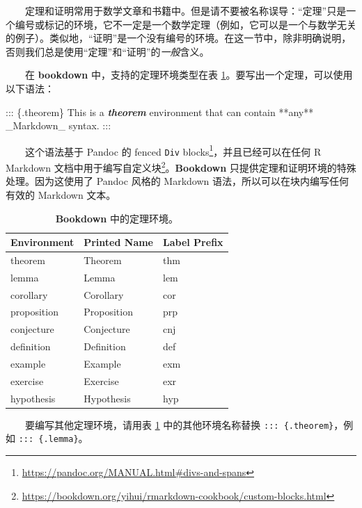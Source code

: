 \documentclass[
  12pt,
]{krantz}
\newenvironment{Shaded}{\begin{snugshade}}{\end{snugshade}}
\newcommand{\InformationTok}[1]{\textcolor[rgb]{0.56,0.35,0.01}{\textbf{\textit{#1}}}}
\newcommand{\NormalTok}[1]{#1}
\renewcommand{\href}[2]{#2\footnote{\url{#1}}}
\theoremstyle{definition}
\theoremstyle{definition}
\theoremstyle{definition}
\theoremstyle{definition}
\theoremstyle{remark}
\begin{document}
  定理和证明常用于数学文章和书籍中。但是请不要被名称误导：``定理''只是一个编号或标记的环境，它不一定是一个数学定理（例如，它可以是一个与数学无关的例子）。类似地，``证明''是一个没有编号的环境。在这一节中，除非明确说明，否则我们总是使用``定理''和``证明''的\emph{一般}含义。

  在 \textbf{bookdown} 中，支持的定理环境类型在表 \ref{tab:theorem-envs}。要写出一个定理，可以使用以下语法：

\begin{Shaded}
\begin{Highlighting}[]
\NormalTok{::: \{.theorem\}}
\NormalTok{This is a }\InformationTok{\textasciigrave{}theorem\textasciigrave{}}\NormalTok{ environment that can contain **any**}
\NormalTok{\_Markdown\_ syntax.}
\NormalTok{:::}
\end{Highlighting}
\end{Shaded}

  这个语法基于 Pandoc 的 \href{https://pandoc.org/MANUAL.html\#divs-and-spans}{fenced \texttt{Div} blocks}，并且已经可以在任何 R Markdown 文档中用于编写\href{https://bookdown.org/yihui/rmarkdown-cookbook/custom-blocks.html}{自定义块}。\textbf{Bookdown} 只提供定理和证明环境的特殊处理。因为这使用了 Pandoc 风格的 Markdown 语法，所以可以在块内编写任何有效的 Markdown 文本。



\begin{table}

\caption{\label{tab:theorem-envs}\textbf{Bookdown} 中的定理环境。}
\centering
\begin{tabular}[t]{lll}
\toprule
Environment & Printed Name & Label Prefix\\
\midrule
theorem & Theorem & thm\\
lemma & Lemma & lem\\
corollary & Corollary & cor\\
proposition & Proposition & prp\\
conjecture & Conjecture & cnj\\
\addlinespace
definition & Definition & def\\
example & Example & exm\\
exercise & Exercise & exr\\
hypothesis & Hypothesis & hyp\\
\bottomrule
\end{tabular}
\end{table}

  要编写其他定理环境，请用表 \ref{tab:theorem-envs} 中的其他环境名称替换 \texttt{:::\ \{.theorem\}}，例如 \texttt{:::\ \{.lemma\}}。
\end{document}
